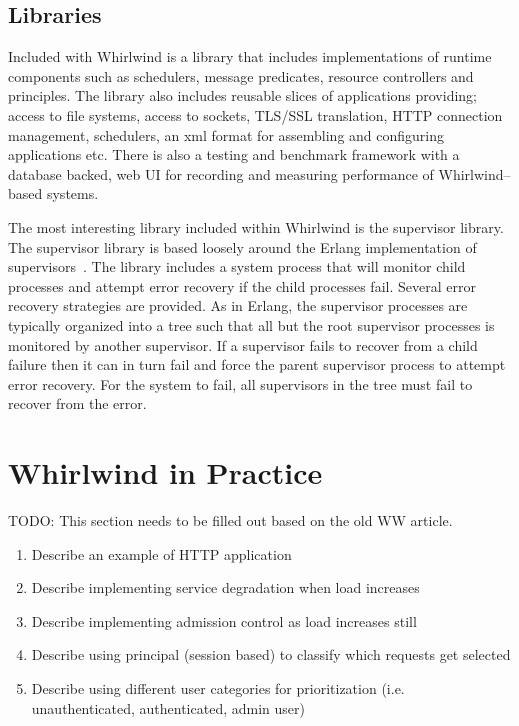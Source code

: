 \documentclass[conference]{IEEEtran}
\begin{document}
\subsection{Libraries}

Included with Whirlwind is a library that includes implementations of runtime components such as schedulers, message predicates, resource controllers and principles. The library also includes reusable slices of applications providing; access to file systems, access to sockets, TLS/SSL translation, HTTP connection management, schedulers, an xml format for assembling and configuring applications etc. There is also a testing and benchmark framework with a database backed, web UI for recording and measuring performance of Whirlwind--based systems.

The most interesting library included within Whirlwind is the supervisor library. The supervisor library is based loosely around the Erlang implementation of supervisors~\cite{Armstrong03Thesis}. The library includes a system process that will monitor child processes and attempt error recovery if the child processes fail. Several error recovery strategies are provided. As in Erlang, the supervisor processes are typically organized into a tree such that all but the root supervisor processes is monitored by another supervisor. If a supervisor fails to recover from a child failure then it can in turn fail and force the parent supervisor process to attempt error recovery. For the system to fail, all supervisors in the tree must fail to recover from the error. 

\section{Whirlwind in Practice}

TODO: This section needs to be filled out based on the old WW article.

\begin{enumerate}
	\item Describe an example of HTTP application
	\item Describe implementing service degradation when load increases
	\item Describe implementing admission control as load increases still
	\item Describe using principal (session based) to classify which requests get selected
	\item Describe using different user categories for prioritization (i.e. unauthenticated, authenticated, admin user)
\end{enumerate}
\end{document}
